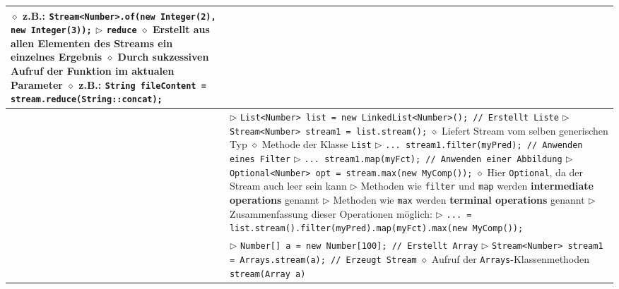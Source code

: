 \begin{tabular}{ | p{} p{} | }
{	\hspace{0.4cm} $\diamond$ z.B.: \texttt{Stream<Number>.of(new Integer(2), new Integer(3));} \\
	$\rhd$ \texttt{reduce} \\
	\hspace{0.4cm} $\diamond$ Erstellt aus allen Elementen des Streams ein einzelnes Ergebnis \\
	\hspace{0.4cm} $\diamond$ Durch sukzessiven Aufruf der Funktion im aktualen Parameter \\
	\hspace{0.4cm} $\diamond$ z.B.: \texttt{String fileContent = stream.reduce(String::concat);} } \\ \hline

	\makecell[l]{Stream aus Liste} & \makecell[l]{
	$\rhd$ \texttt{List<Number> list = new LinkedList<Number>(); // Erstellt Liste}	\\
	$\rhd$ \texttt{Stream<Number> stream1 = list.stream();} \\
	\hspace{0.4cm} $\diamond$ Liefert Stream vom selben generischen Typ \\
	\hspace{0.4cm} $\diamond$ Methode der Klasse \texttt{List} \\
	$\rhd$ \texttt{... stream1.filter(myPred); // Anwenden eines Filter} \\
	$\rhd$ \texttt{... stream1.map(myFct); // Anwenden einer Abbildung} \\
	$\rhd$ \texttt{Optional<Number> opt = stream.max(new MyComp());} \\
	\hspace{0.4cm} $\diamond$ Hier \texttt{Optional}, da der Stream auch leer sein kann \\
	$\rhd$ Methoden wie \texttt{filter} und \texttt{map} werden \textbf{intermediate operations} genannt \\
	$\rhd$ Methoden wie \texttt{max} werden \textbf{terminal operations} genannt \\
	$\rhd$ Zusammenfassung dieser Operationen möglich: \\
	$\rhd$ \texttt{... =  list.stream().filter(myPred).map(myFct).max(new MyComp());} } \\ \hline

	\makecell[l]{Stream aus Array} & \makecell[l]{
	$\rhd$ \texttt{Number[] a = new Number[100]; // Erstellt Array} \\
	$\rhd$ \texttt{Stream<Number> stream1 = Arrays.stream(a); // Erzeugt Stream} \\
	\hspace{0.4cm} $\diamond$ Aufruf der \texttt{Arrays}-Klassenmethoden \texttt{stream(Array a)} } \\ \hline


\end{tabular}
